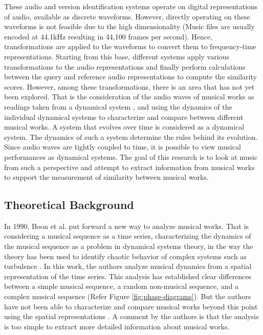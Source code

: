\documentclass[../main.tex]{subfiles}
\begin{document}
\par
These audio and version identification systems operate on digital representations of audio, available as discrete waveforms. However, directly operating on these waveforms is not feasible due to the high dimensionality (Music files are usually encoded at 44.1kHz resulting in 44,100 frames per second). Hence, transformations are applied to the waveforms to convert them to frequency-time representations. Starting from this base, different systems apply various transformations to the audio representations  and finally perform calculations between the query and reference audio representations to compute the similarity scores. However, among these transformations, there is an area that has not yet been explored. That is the consideration of the audio waves of musical works as readings taken from a dynamical system \cite{complex_dynamics}, and using the dynamics of the individual dynamical systems to characterize and compare between different musical works. A system that evolves over time is considered as a dynamical system. The dynamics of such a system determine the rules behind its evolution. Since audio waves are tightly coupled to time, it is possible to view musical performances as dynamical systems. The goal of this research is to look at music from such a perspective and attempt to extract information from musical works to support the measurement of similarity between musical works.



\subsection{Theoretical Background}

\par
In 1990, Boon et al. put forward a new way to analyze musical works. That is considering a musical sequence as a time series, characterizing the dynamics of the musical sequence as a problem in dynamical systems theory, in the way the theory has been used to identify chaotic behavior of complex systems such as turbulence \cite{complex_dynamics}. In this work, the authors analyze musical dynamics from a spatial representation of the time series. This analysis has established clear differences between a simple musical sequence, a random non-musical sequence, and a complex musical sequence (Refer Figure \ref{fig:phase-diagrams}). But the authors have not been able to characterize and compare musical works beyond this point using the spatial representations \cite{boonDynamicalSystemsTheory1995}. A comment by the authors is that the analysis is too simple to extract more detailed information about musical works.
\end{document}
